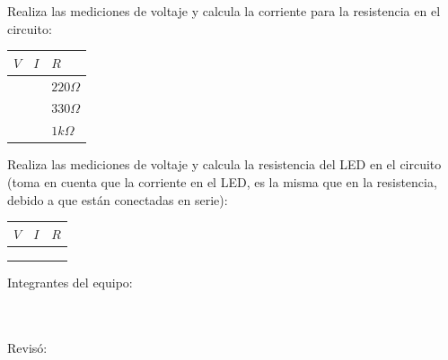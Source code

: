 	Realiza las mediciones de voltaje y calcula la corriente para la resistencia en el circuito:

	\begin{center}
		\begin{tabular}{|p{1.5cm}|p{1.5cm}|p{1.5cm}|}
			\hline
			$V$ & $I$ & $R$          \\
			\hline
			    &     & $220 \Omega$ \\
			\hline
			    &     & $330 \Omega$ \\
			\hline
			    &     & $1 k \Omega$ \\
			\hline
		\end{tabular}
	\end{center}

	Realiza las mediciones de voltaje y calcula la resistencia del LED en el circuito (toma en cuenta que la corriente en el LED, es la misma que en la resistencia, debido a que están conectadas en serie):

	\begin{center}
		\begin{tabular}{|p{1.5cm}|p{1.5cm}|p{1.5cm}|}
			\hline
			$V$ & $I$ & $R$ \\
			\hline
			    &     &     \\
			\hline
			    &     &     \\
			\hline
			    &     &     \\
			\hline
		\end{tabular}
	\end{center}

	Integrantes del equipo: \\[0.2cm]
	\horrule{0.5pt} \\[0.2cm] %
	\horrule{0.5pt} \\[0.2cm] %
	\horrule{0.5pt} %

	Revisó: \\[0.2cm]
	\horrule{0.5pt} \\%
    

